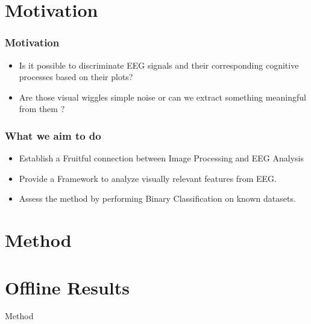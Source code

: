 \documentclass[11pt]{beamer}
\begin{document}
    \section{Motivation}
    \begin{frame}
        \frametitle{Motivation}
        \begin{center}
            \begin{itemize}
                \item Is it possible to discriminate EEG signals and their corresponding cognitive processes based on their plots? 
                \item Are those visual wiggles simple noise or can we extract something meaningful from them ?
            \end{itemize}
        \end{center}
    \end{frame}
    \begin{frame}
        \frametitle{What we aim to do}
        \begin{center}
            \begin{itemize}
                \item Establish a Fruitful connection between Image Processing and EEG Analysis
                \item Provide a Framework to analyze visually relevant features from EEG.
                \item Assess the method by performing Binary Classification on known datasets.
            \end{itemize}
        \end{center}
    \end{frame}
    
    
   \section{Method}
   \section{Offline Results}
    \begin{frame}
        \begin{center}
            \LARGE Method   
        \end{center}
    \end{frame}
    
\end{document}
